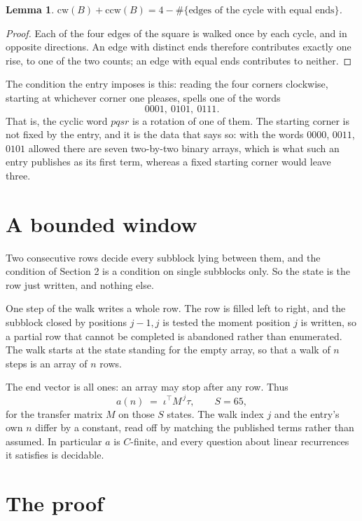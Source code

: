 \documentclass[11pt,a4paper]{article}
\theoremstyle{plain}
\newtheorem{lemma}[theorem]{Lemma}
\theoremstyle{definition}
\begin{document}
\begin{lemma}\label{lem:sum}
$\mathrm{cw}(B)+\mathrm{ccw}(B)=4-\#\{\text{edges of the cycle with equal ends}\}$.
\end{lemma}

\begin{proof}
Each of the four edges of the square is walked once by each cycle, and in opposite directions.
An edge with distinct ends therefore contributes exactly one rise, to one of the two counts;
an edge with equal ends contributes to neither.
\end{proof}

The condition the entry imposes is this: reading the four corners clockwise, starting at whichever corner one pleases, spells one of the words
\[
0001,\ 0101,\ 0111.
\]
That is, the cyclic word $pqsr$ is a rotation of one of them. The starting corner is not fixed by the entry, and it is the data that says so: with the words $0000$, $0011$, $0101$ allowed there are seven two-by-two binary arrays, which is what such an entry publishes as its first term, whereas a fixed starting corner would leave three.

\section{A bounded window}

Two consecutive rows decide every subblock lying between them, and the condition of Section 2 is a condition on single subblocks only. So the state is the row just written, and nothing else.

One step of the walk writes a whole row. The row is filled left to right, and the subblock
closed by positions $j-1,j$ is tested the moment position $j$ is written, so a partial row that
cannot be completed is abandoned rather than enumerated. The walk starts at the state standing
for the empty array, so that a walk of $n$ steps is an array of $n$ rows.

The end vector is all ones: an array may stop after any row. Thus
\[
a(n)\;=\;\iota^{\!\top}M^{\,j}\tau ,\qquad S=65,
\]
for the transfer matrix $M$ on those $S$ states. The walk index $j$ and the entry's own $n$
differ by a constant, read off by matching the published terms rather than assumed. In
particular $a$ is $C$-finite, and every question about linear recurrences it satisfies is
decidable.

\section{The proof}
\end{document}
